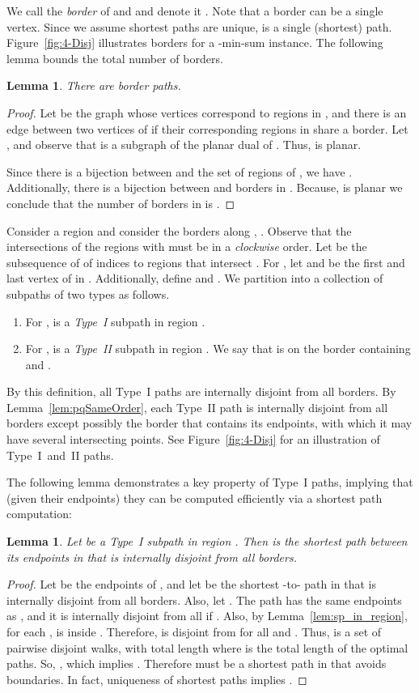 \documentclass[11pt,twoside]{article}
\newtheorem{lemma}[theorem]{Lemma}
\begin{document}
We call  the \emph{border} of  and  and denote it .   Note that a border can be a single vertex. Since we assume shortest paths are unique,  is a single (shortest) path.
Figure~\ref{fig:4-Disj} illustrates borders for a -min-sum instance.  The following lemma bounds the total number of borders.

\begin{lemma}
\label{lem:bounded_number_borders}
There are  border paths. 
\end{lemma}
\begin{proof}
Let  be the graph whose vertices correspond to regions in , and there is an edge between two vertices of  if their corresponding regions in  share a border.  Let , and observe that  is a subgraph of the planar dual of .  Thus,  is planar.

Since there is a bijection between  and the set of regions of , we have .
Additionally, there is a bijection between  and borders in .  Because,  is planar we conclude that the number of borders in  is .
\end{proof}

Consider a region  and consider the borders along , .  Observe that the intersections of the regions  with  must be in a {\em clockwise} order.  Let  be the subsequence of  of indices to regions that intersect .  For , let  and  be the first and last vertex of  in .  Additionally, define  and . We partition  into a collection of subpaths of two types as follows.
\begin{enumerate}[Type~I :]
\item For ,  is a {\em Type~I} subpath in region .
\item For ,  is a {\em Type~II} subpath in region .  We say that  is on the border  containing  and .
\end{enumerate}
By this definition, all Type~I paths are internally disjoint from all borders. By Lemma~\ref{lem:pqSameOrder}, each Type~II path is internally disjoint from all borders except possibly the border that contains its endpoints, with which it may have several intersecting points.  See Figure~\ref{fig:4-Disj} for an illustration of Type~I~and~II paths.

The following lemma demonstrates a key property of Type~I paths, implying that (given their endpoints) they can be computed efficiently via a shortest path computation:
\begin{lemma} 
\label{lem:alpha_opt}
Let  be a Type~I subpath in region .  
Then  is the shortest path between its endpoints in  that is internally disjoint from all borders.
\end{lemma}
\begin{proof}
Let  be the endpoints of , and let  be the shortest -to- path in  that is internally disjoint from all borders.
Also, let .  
The path  has the same endpoints as , and it is internally disjoint from all  if .
Also, by Lemma~\ref{lem:sp_in_region}, for each ,  is inside .
Therefore,  is disjoint from  for all  and .
Thus,  is a set of  pairwise disjoint walks, with total length  where  is the total length of the optimal paths.
So, , which implies .
Therefore  must be a shortest  path in  that avoids boundaries.  In fact, uniqueness of shortest paths implies .
\end{proof}
\end{document}
